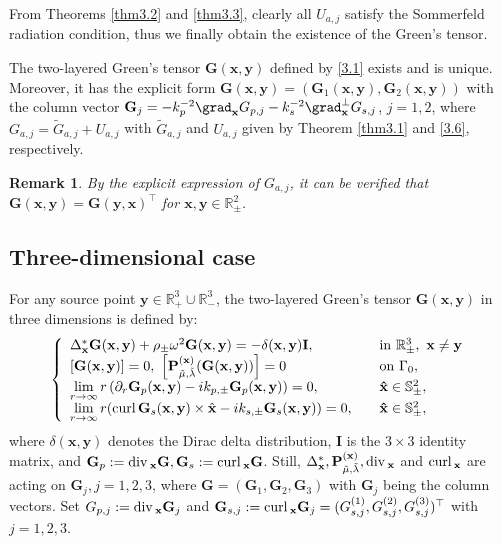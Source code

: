 \documentclass[final,reqno]{siamltex}
\newcommand{\om}{\omega}
\newcommand{\pa}{\partial}
\newcommand{\curl}{{\rm curl\,}}
\newcommand{\dive}{{\rm div\,}}
\newcommand{\wid}{\widetilde}
\newcommand{\mat}{\mathbb}
\newcommand{\R}{{\mat R}}
\newcommand{\Sp}{{\mat S}}
\newcommand{\be}{\begin{eqnarray}}
\newcommand{\en}{\end{eqnarray}}
\newtheorem{remark}[theorem]{Remark}
\begin{document}
From Theorems \ref{thm3.2} and \ref{thm3.3}, clearly all $U_{a,j}$ satisfy the Sommerfeld radiation condition, thus we finally obtain the existence of the Green's tensor. 
\begin{theorem}\label{thm3.4}
	The two-layered Green's tensor $\mathbf{G}(\mathbf{x},\mathbf{y})$ defined by \eqref{3.1} exists and is unique. Moreover, it has the explicit form $\mathbf{G}(\mathbf{x},\mathbf{y})=(\mathbf{G}_1(\mathbf{x},\mathbf{y}),\mathbf{G}_2(\mathbf{x},\mathbf{y}))$ with the column vector $\mathbf{G}_j=-k_p^{-2}\grad_{\mathbf{x}}G_{p,j}-k_s^{-2}\grad_{\mathbf{x}}^\perp G_{s,j}$, $j=1,2$, where $G_{a,j}=\wid G_{a,j}+U_{a,j}$ with $\wid G_{a,j}$ and $U_{a,j}$ given by Theorem {\rm \ref{thm3.1}} and \eqref{3.6}, respectively. 
\end{theorem}
\begin{remark}\label{rem3.5}
	By the explicit expression of $G_{a,j}$, it can be verified that $\mathbf{G}(\mathbf{x},\mathbf{y})=\mathbf{G}(\mathbf{y},\mathbf{x})^\top$ for $\mathbf{x},\mathbf{y}\in\R^2_\pm$. 
\end{remark}








\subsection{Three-dimensional case}\label{sec3.2}
For any source point $\mathbf{y}\in\R^3_+\cup\R^3_-$, the two-layered Green's tensor $\mathbf{G}(\mathbf{x},\mathbf{y})$ in three dimensions is defined by: 
\be\label{3.9}
   \left\{
  \begin{array}{ll}
  	\Delta^*_{\mathbf{x}}\mathbf{G}(\mathbf{x},\mathbf{y})+\rho_\pm\om^2\mathbf{G}(\mathbf{x},\mathbf{y})=-\delta(\mathbf{x},\mathbf{y})\mathbf{I},~~~&{\rm in}~\R^3_\pm,~\mathbf{x}\neq\mathbf{y}\\
  	\left[\mathbf{G}(\mathbf{x},\mathbf{y})\right]=0,~\left[\mathbf{P}_{\tilde{\mu},\tilde{\lambda}}^{(\mathbf{x})}(\mathbf{G}(\mathbf{x},\mathbf{y}))\right]=0~~~&{\rm on}~\Gamma_0, \\
  	\lim\limits_{r\rightarrow\infty}r\left(\pa_r\mathbf{G}_p(\mathbf{x},\mathbf{y})-ik_{p,\pm}\mathbf{G}_p(\mathbf{x},\mathbf{y})\right)=0,~~~&\mathbf{\hat x}\in\Sp^2_\pm, \\
  	\lim\limits_{r\rightarrow\infty}r(\curl\mathbf{G}_s(\mathbf{x},\mathbf{y})\times\hat{\mathbf{x}}-ik_{s,\pm}\mathbf{G}_s(\mathbf{x},\mathbf{y}))=0,~~~&\mathbf{\hat x}\in\Sp^2_\pm, 
  \end{array}
  \right.
\en
where $\delta(\mathbf{x},\mathbf{y})$ denotes the Dirac delta distribution, $\mathbf{I}$ is the $3\times3$ identity matrix, and $\mathbf{G}_p:=\dive_{\mathbf{x}}\mathbf{G}, \mathbf{G}_s:=\curl_{\mathbf{x}}\mathbf{G}$. Still, $\Delta^*_{\mathbf{x}}, \mathbf{P}_{\tilde{\mu},\tilde{\lambda}}^{(\mathbf{x})},\dive_{\mathbf{x}}$ and $\curl_{\mathbf{x}}$ are acting on $\mathbf{G}_j, j=1,2,3$, where $\mathbf{G}=(\mathbf{G}_1,\mathbf{G}_2,\mathbf{G}_3)$ with $\mathbf{G}_j$ being the column vectors. Set $G_{p,j}:=\dive_{\mathbf{x}}\mathbf{G}_j$ and $\mathbf{G}_{s,j}:=\curl_{\mathbf{x}}\mathbf{G}_j=(G_{s,j}^{(1)},G_{s,j}^{(2)},G_{s,j}^{(3)})^\top$ with $j=1,2,3$. 
\end{document}
